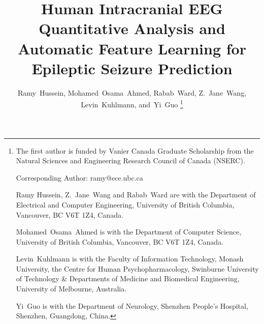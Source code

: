 \documentclass[journal]{IEEEtran}
\begin{document}
\title{Human Intracranial EEG Quantitative Analysis and Automatic Feature Learning for Epileptic Seizure Prediction}


\author{Ramy~Hussein, Mohamed~Osama~Ahmed, Rabab~Ward, Z.~Jane~Wang, Levin~Kuhlmann, and~Yi~Guo
\thanks{The first author is funded by Vanier Canada Graduate Scholarship from the Natural Sciences and Engineering Research Council of Canada (NSERC).

Corresponding Author: ramy@ece.ubc.ca 

Ramy Hussein, Z.~Jane~Wang and Rabab~Ward are with the Department of Electrical and Computer Engineering, University of British Columbia, Vancouver, BC V6T 1Z4, Canada.

Mohamed~Osama~Ahmed is with the Department of Computer Science, University of British Columbia, Vancouver, BC V6T 1Z4, Canada.

Levin~Kuhlmann is with the Faculty of Information Technology, Monash University, the Centre for Human Psychopharmacology, Swinburne University of Technology \& Departments of Medicine and Biomedical Engineering, University of Melbourne, Australia.

Yi~Guo is with the Department of Neurology, Shenzhen People's Hospital, Shenzhen, Guangdong, China.

}
}
\maketitle
\end{document}
